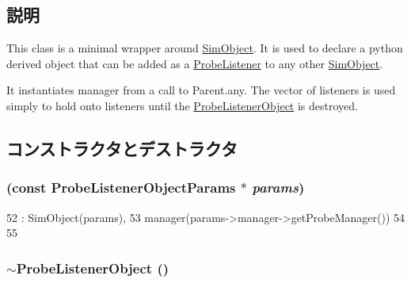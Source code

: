 \subsection{説明}
This class is a minimal wrapper around \hyperlink{classSimObject}{SimObject}. It is used to declare a python derived object that can be added as a \hyperlink{classProbeListener}{ProbeListener} to any other \hyperlink{classSimObject}{SimObject}.

It instantiates manager from a call to Parent.any. The vector of listeners is used simply to hold onto listeners until the \hyperlink{classProbeListenerObject}{ProbeListenerObject} is destroyed. 

\subsection{コンストラクタとデストラクタ}
\hypertarget{classProbeListenerObject_a7f3ac1c92134f0c44bf10a9905fed190}{
\subsubsection[{ProbeListenerObject}]{ (const ProbeListenerObjectParams $\ast$ {\em params})}}
\label{classProbeListenerObject_a7f3ac1c92134f0c44bf10a9905fed190}



\begin{DoxyCode}
52     : SimObject(params),
53       manager(params->manager->getProbeManager())
54 {
55 }
\end{DoxyCode}
\hypertarget{classProbeListenerObject_afd077e0d2cf6c6d5d6c310fed424bd18}{
\subsubsection[{$\sim$ProbeListenerObject}]{\setlength{\rightskip}{0pt plus 5cm}$\sim${\bf ProbeListenerObject} ()}}
\label{classProbeListenerObject_afd077e0d2cf6c6d5d6c310fed424bd18}



